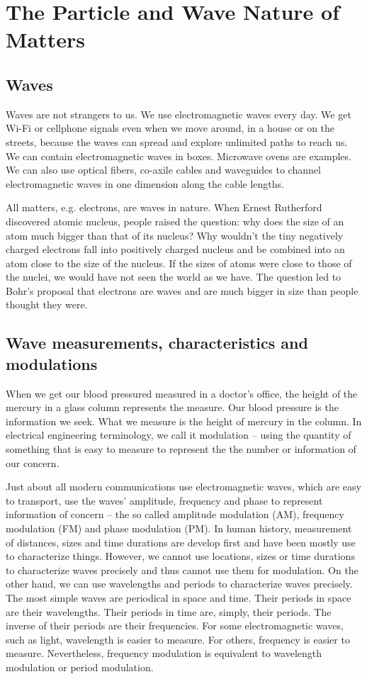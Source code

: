 \documentclass{book}
\begin{document}
\section{The Particle and Wave Nature of Matters}
\subsection{Waves}
Waves are not strangers to us. We use electromagnetic waves every day. We get Wi-Fi or cellphone signals even when we move around, in a house or on the streets, because the waves can spread and explore unlimited paths to reach us. We can contain electromagnetic waves in boxes. Microwave ovens are examples. We can also use optical fibers, co-axile cables and waveguides to channel electromagnetic waves in one dimension along the cable lengths.

All matters, e.g. electrons, are waves in nature. When Ernest Rutherford discovered atomic nucleus, people raised the question: why does the size of an atom much bigger than that of its nucleus? Why wouldn't the tiny negatively charged electrons fall into positively charged nucleus and be combined into an atom close to the size of the nucleus. If the sizes of atoms were close to those of the nuclei, we would have not seen the world as we have. The question led to Bohr's proposal that electrons are waves and are much bigger in size than people thought they were.

\subsection{Wave measurements, characteristics and modulations}
When we get our blood pressured measured in a doctor's office, the height of the mercury in a glass column represents the measure. Our blood pressure is the information we seek. What we measure is the height of mercury in the column. In electrical engineering terminology, we call it modulation -- using the quantity of something that is easy to measure to represent the the number or information of our concern.

Just about all modern communications use electromagnetic waves, which are easy to transport, use the waves' amplitude, frequency and phase to represent information of concern -- the so called amplitude modulation (AM), frequency modulation (FM) and phase modulation (PM). In human history, measurement of distances, sizes and time durations are develop first and have been mostly use to characterize things. However, we cannot use locations, sizes or time durations to characterize waves precisely and thus cannot use them for modulation. On the other hand, we can use wavelengths and periods to characterize waves precisely. The most simple waves are periodical in space and time. Their periods in space are their wavelengths. Their periods in time are, simply, their periods. The inverse of their periods are their frequencies. For some electromagnetic waves, such as light, wavelength is easier to measure. For others, frequency is easier to measure. Nevertheless, frequency modulation is equivalent to wavelength modulation or period modulation.
\end{document}
